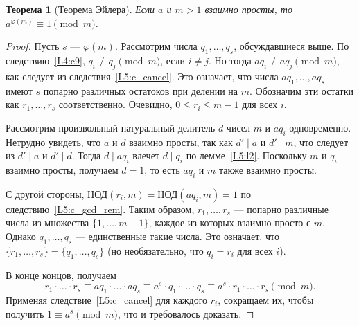 \documentclass[12pt,notitlepage]{article}
\theoremstyle{plain}
\newtheorem{thm}{Теорема}[section]
\theoremstyle{definition}
\theoremstyle{plain}
\renewcommand{\phi}{\varphi}
\newcommand{\1}{\mathbf{1}}
\newcommand{\0}{\mathbf{0}}
\newcommand{\dvd}{\mathop{\mid}}
\begin{document}
\begin{thm}[Теорема Эйлера]
	Если $a$ и $m > 1$ взаимно просты, то $a^{\phi(m)} \equiv 1 \pmod m$.
\end{thm}
\begin{proof}
	Пусть $s$ --- $\phi(m)$. Рассмотрим числа $q_1, \ldots, q_s$, обсуждавшиеся выше. По следствию~\ref{L4:c9}, $q_i \not\equiv q_j \pmod m$, если $i \neq j$. Но тогда $a q_i \not\equiv a q_j \pmod m$, как следует из следствия~\ref{L5:c_cancel}. Это означает, что числа $a q_1, \ldots, a q_s$ имеют $s$ попарно различных остатоков при делении на $m$. Обозначим эти остатки как $r_1,\ldots, r_s$ соответственно. Очевидно, $0 \leq r_i \leq m - 1$ для всех $i$.
	
	Рассмотрим произвольный натуральный делитель $d$ чисел $m$ и $a q_i$ одновременно. Нетрудно увидеть, что $a$ и $d$ взаимно просты, так как $d' \dvd a$ и $d' \dvd m$, что следует из $d' \dvd  a$ и $d' \dvd d$. Тогда $d \dvd a q_i$ влечет $d \dvd q_i$ по лемме~\ref{L5:l2}. Поскольку $m$ и $q_i$ взаимно просты, получаем $d = 1$, то есть $a q_i$ и $m$ также взаимно просты. 
	
	С другой стороны, $\text{НОД}(r_i, m) = \text{НОД}(a q_i, m) = 1$ по следствию~\ref{L5:c_gcd_rem}. Таким образом, $r_1, \ldots, r_s$ --- попарно различные числа из множества $\{1,\ldots, m-1\}$, каждое из которых взаимно просто с $m$. Однако $q_1, \ldots, q_s$ --- единственные такие числа. Это означает, что $\{r_1, \ldots, r_s \} = \{q_1, \ldots, q_s\}$ (но необязательно, что $q_i = r_i$ для всех $i$).
	
	В конце концов, получаем
	$$r_1\cdot \ldots \cdot r_s \equiv a q_1 \cdot \ldots \cdot a q_s \equiv a^s \cdot q_1 \cdot \ldots \cdot q_s \equiv a^s \cdot r_1 \cdot \ldots \cdot r_s \pmod m.$$
	Применяя следствие~\ref{L5:c_cancel} для каждого $r_i$, сокращаем их, чтобы получить $1 \equiv a^s \pmod m$, что и требовалось доказать.
\end{proof}
\end{document}
